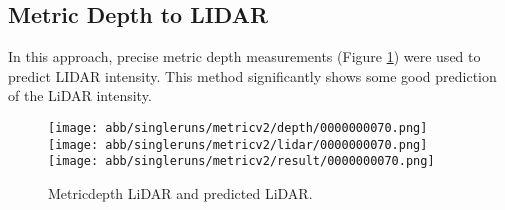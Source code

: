 \subsection{Metric Depth to LIDAR}

In this approach, precise metric depth measurements (Figure \ref{metric_results}) were used to predict LIDAR intensity. This method significantly shows some good prediction of the LiDAR intensity.
\begin{figure}[!ht]
	\centering
	\texttt{[image: abb/singleruns/metricv2/depth/0000000070.png]}
	\texttt{[image: abb/singleruns/metricv2/lidar/0000000070.png]}
	\texttt{[image: abb/singleruns/metricv2/result/0000000070.png]}
	\caption{Metricdepth LiDAR and predicted LiDAR.}
	\label{metric_results}
\end{figure}
\newpage	
